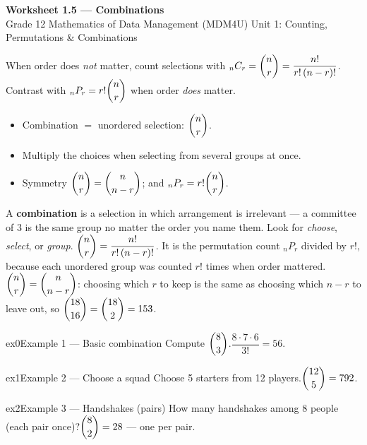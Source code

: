 \documentclass[11pt]{article}
\begin{document}
\begin{center}
{\LARGE\bfseries\color{titleblue}Worksheet 1.5 --- Combinations}\\[2pt]
{\small Grade 12 Mathematics of Data Management (MDM4U) \textperiodcentered{} Unit 1: Counting, Permutations \& Combinations}
\end{center}

\begin{ideabox}
When order does \emph{not} matter, count selections with $_nC_r=\dbinom{n}{r}=\dfrac{n!}{r!\,(n-r)!}$. Contrast with $_nP_r=r!\dbinom{n}{r}$ when order \emph{does} matter.
\begin{itemize}[leftmargin=*,itemsep=2pt]
  \item Combination $=$ unordered selection: $\dbinom{n}{r}$.
  \item Multiply the choices when selecting from several groups at once.
  \item Symmetry $\dbinom{n}{r}=\dbinom{n}{n-r}$; and $_nP_r=r!\dbinom{n}{r}$.
\end{itemize}
\end{ideabox}

\begin{learnbox}
A \textbf{combination} is a selection in which arrangement is irrelevant — a committee of 3 is the same group no matter the order you name them. Look for \emph{choose}, \emph{select}, or \emph{group}.
$\dbinom{n}{r}=\dfrac{n!}{r!\,(n-r)!}$. It is the permutation count ${}_{n}P_{r}$ divided by $r!$, because each unordered group was counted $r!$ times when order mattered.
$\dbinom{n}{r}=\dbinom{n}{n-r}$: choosing which $r$ to keep is the same as choosing which $n-r$ to leave out, so $\dbinom{18}{16}=\dbinom{18}{2}=153$.
\end{learnbox}


\begin{example}{ex0}{Example 1 --- Basic combination}
Compute $\dbinom{8}{3}$.\soln $\dfrac{8\cdot7\cdot6}{3!}=56$.
\end{example}

\begin{example}{ex1}{Example 2 --- Choose a squad}
Choose 5 starters from 12 players.\soln $\dbinom{12}{5}=792$.
\end{example}

\begin{example}{ex2}{Example 3 --- Handshakes (pairs)}
How many handshakes among 8 people (each pair once)?\soln $\dbinom{8}{2}=28$ --- one per pair.
\end{example}
\end{document}
